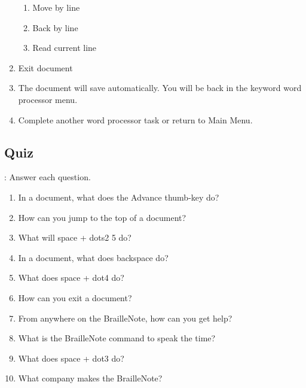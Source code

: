 \documentclass[10pt,letterpaper,twoside]{report}
\begin{document}
\begin{enumerate}
\begin{enumerate}
		      \item Move by line 
		      \item Back by line 
		      \item Read current line 
	      \end{enumerate}
	\item Exit document 
	\item The document will save automatically. You will be back in the keyword word processor menu.
	\item Complete another word processor task or return to Main Menu.
\end{enumerate}

\clearpage 
\subsection{Quiz}:
Answer each question.
\begin{enumerate}
	\item In a document, what does the Advance thumb-key do?
	\item How can you jump to the top of a document?
	\item What will space + dots2 5 do?
	\item In a document, what does backspace do?
	\item  What does space + dot4 do?
	\item How can you exit a document?
	\item From anywhere on the BrailleNote, how can you get help?
	\item What is the BrailleNote command to speak the time?
	\item What does space + dot3 do?
	\item What company makes the BrailleNote?
\end{enumerate}

\clearpage 
\end{document}
